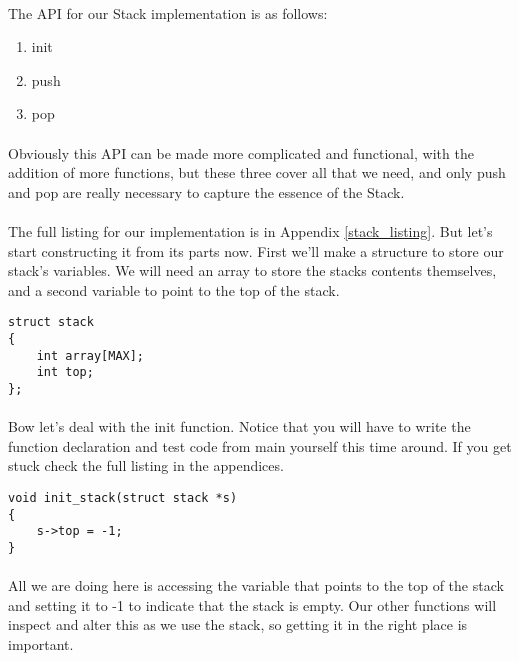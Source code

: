 \documentclass[10pt, a4paper, twosize]{article}
\begin{document}
\paragraph{} The API for our Stack implementation is as follows:

\begin{enumerate}
\item init
\item push
\item pop
\end{enumerate}

\paragraph{} Obviously this API can be made more complicated and functional, with the addition of more functions, but these three cover all that we need, and only push and pop are really necessary to capture the essence of the Stack.

\paragraph{} The full listing for our implementation is in Appendix \ref{stack_listing}. But let's start constructing it from its parts now. First we'll make a structure to store our stack's variables. We will need an array to store the stacks contents themselves, and a second variable to point to the top of the stack. 

\begin{lstlisting}
struct stack
{
    int array[MAX];
    int top;
};
\end{lstlisting}

\paragraph{} Bow let's deal with the init function. Notice that you will have to write the function declaration and test code from main yourself this time around. If you get stuck check the full listing in the appendices.

\begin{lstlisting}
void init_stack(struct stack *s)
{
    s->top = -1;
}
\end{lstlisting}

\paragraph{} All we are doing here is accessing the variable that points to the top of the stack and setting it to -1 to indicate that the stack is empty. Our other functions will inspect and alter this as we use the stack, so getting it in the right place is important.
\end{document}
